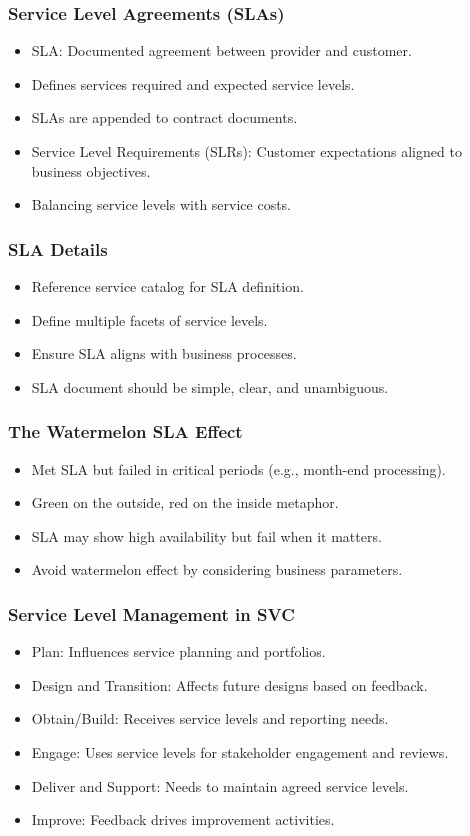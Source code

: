 \documentclass[aspectratio=169, table]{beamer}
\begin{document}
\begin{frame}
	\frametitle{Service Level Agreements (SLAs)}
	\begin{itemize}
		\item SLA: Documented agreement between provider and customer.
		\item Defines services required and expected service levels.
		\item SLAs are appended to contract documents.
		\item Service Level Requirements (SLRs): Customer expectations aligned to business objectives.
		\item Balancing service levels with service costs.
	\end{itemize}
\end{frame}

\begin{frame}
	\frametitle{SLA Details}
	\begin{itemize}
		\item Reference service catalog for SLA definition.
		\item Define multiple facets of service levels.
		\item Ensure SLA aligns with business processes.
		\item SLA document should be simple, clear, and unambiguous.
	\end{itemize}
\end{frame}

\begin{frame}
	\frametitle{The Watermelon SLA Effect}
	\begin{itemize}
		\item Met SLA but failed in critical periods (e.g., month-end processing).
		\item Green on the outside, red on the inside metaphor.
		\item SLA may show high availability but fail when it matters.
		\item Avoid watermelon effect by considering business parameters.
	\end{itemize}
\end{frame}

\begin{frame}
	\frametitle{Service Level Management in SVC}
	\begin{itemize}
		\item Plan: Influences service planning and portfolios.
		\item Design and Transition: Affects future designs based on feedback.
		\item Obtain/Build: Receives service levels and reporting needs.
		\item Engage: Uses service levels for stakeholder engagement and reviews.
		\item Deliver and Support: Needs to maintain agreed service levels.
		\item Improve: Feedback drives improvement activities.
	\end{itemize}
\end{frame}
\end{document}
